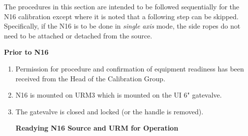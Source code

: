 The procedures in this section are intended to be followed sequentially for the N16 calibration except where it is noted that a following step can be skipped. Specifically, if the N16 is to be done in {\it single axis} mode, the side ropes do not need to be attached or detached from the source.

{\bf Prior to N16}

\begin{enumerate}
\item \CheckBox[name=n16p1]{} Permission for procedure and confirmation of equipment readiness has been received from the Head of the Calibration Group.
\item \CheckBox[name=n16p2]{} N16 is mounted on URM3 which is mounted on the UI 6" gatevalve.
\item \CheckBox[name=n16p3]{} The gatevalve is closed and locked (or the handle is removed).

{\bf Readying N16 Source and URM for Operation}


\end{enumerate}
